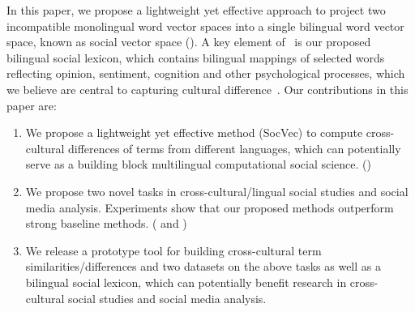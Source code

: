In this paper, we propose a lightweight yet effective approach to project 
two incompatible monolingual word vector spaces into 
a single bilingual word vector space, known as 
social vector space (\textit{\socvec}).
A key element of \socvec\ is our proposed bilingual social lexicon, which 
contains bilingual mappings of selected words reflecting opinion, sentiment, cognition and other psychological 
processes, which we believe are central to capturing cultural difference~\cite{Garimella2016IdentifyingCD}.
Our contributions in this paper are: 
\begin{enumerate}
	\item We propose a lightweight yet effective method (SocVec) to compute cross-cultural differences of terms from different languages, which can potentially serve as a building block multilingual computational social science. ()
	
	\item We propose two novel tasks in cross-cultural/lingual social studies and social media analysis. Experiments
	show that our proposed methods outperform strong baseline methods. ( and )
	
	\item We release a prototype tool for building cross-cultural term similarities/differences and 
	two datasets on the above tasks as well as 
	a bilingual social lexicon, which can potentially benefit research in cross-cultural social studies and social media analysis.
\end{enumerate}
